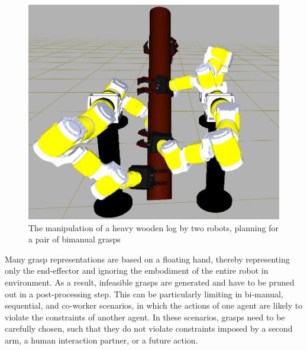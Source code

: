\documentclass[a4paper,10pt,twocolumn]{article}
\begin{document}
\begin{figure}[t]
  \begin{center}
    \includegraphics[width=1.0\linewidth]{./images/showOff.png} \quad 
  \end{center}
  \caption{The manipulation of a heavy wooden log by two robots, planning for a pair of bimanual grasps}
  \label{fig:showOff}
\end{figure}


Many grasp representations are based on a floating hand, thereby representing only the
end-effector and ignoring the embodiment of the entire robot in environment. As a result, infeasible
grasps are generated and have to be pruned out in a post-processing step. This can be particularly
limiting in bi-manual, sequential, and co-worker scenarios, in which the actions of one agent are likely to violate the constraints of another agent. In these scenarios, grasps need to be carefully chosen, such that they do not violate constraints imposed by a second arm, a human interaction partner, or a future action. 
\end{document}
